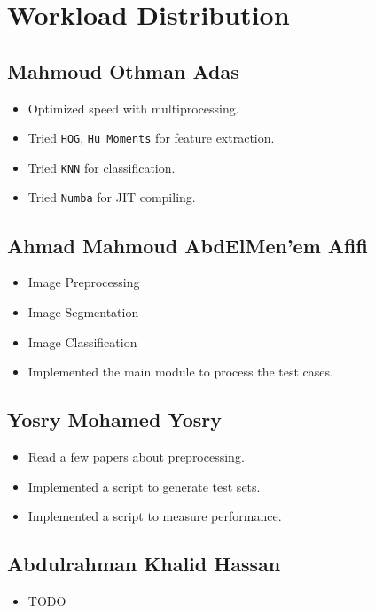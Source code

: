 \section{Workload Distribution}

\subsection{Mahmoud Othman Adas}
\begin{itemize}
    \item Optimized speed with multiprocessing.
    \item Tried \texttt{HOG}, \texttt{Hu Moments} for feature extraction.
    \item Tried \texttt{KNN} for classification.
    \item Tried \texttt{Numba} for JIT compiling.
\end{itemize}

\subsection{Ahmad Mahmoud AbdElMen'em Afifi}
\begin{itemize}
    \item Image Preprocessing
    \item Image Segmentation
    \item Image Classification
    \item Implemented the main module to process the test cases.
\end{itemize}

\subsection{Yosry Mohamed Yosry}
\begin{itemize}
    \item Read a few papers about preprocessing.
    \item Implemented a script to generate test sets.
    \item Implemented a script to measure performance.
\end{itemize}

\subsection{Abdulrahman Khalid Hassan}
\begin{itemize}
    \item TODO
\end{itemize}
